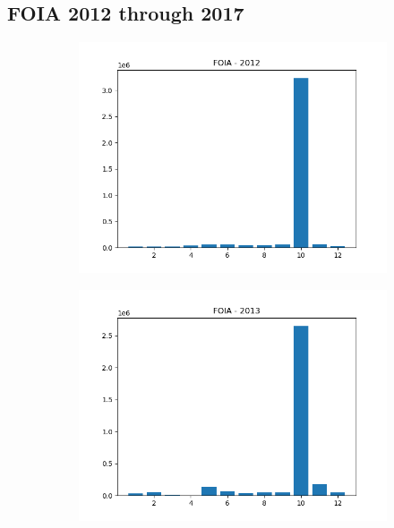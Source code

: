 \documentclass{article}
\begin{document}
\subsection*{FOIA 2012 through 2017}
\begin{figure}[H]
    \begin{subfigure}{.5\textwidth}
        \centering
        \includegraphics[width=\textwidth]{../../output/figures/annual_source_distribution/FOIA_data_dist_2012.png}
    \end{subfigure}
    \begin{subfigure}{.5\textwidth}
        \centering
        \includegraphics[width=\textwidth]{../../output/figures/annual_source_distribution/FOIA_data_dist_2013.png}

\end{subfigure}
\end{figure}
\end{document}
